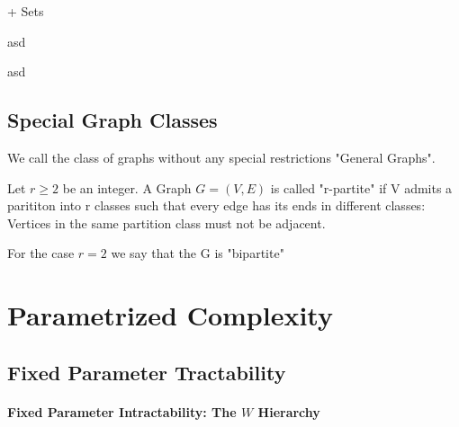 \begin{definition}
+ Sets
\end{definition}

\begin{definition}
    asd
\end{definition}

\begin{definition}
    asd
\end{definition}

\subsection*{Special Graph Classes}
We call the class of graphs without any special restrictions "General Graphs".

\begin{definition}
    Let $r \geq 2$ be an integer. A Graph $G = (V,E)$ is called "r-partite" if V admits a parititon into r classes such that every edge has its ends in different classes: Vertices in the same partition class must not be adjacent. 
    
    For the case $r = 2$ we say that the G is "bipartite" 

\end{definition}

\begin{definition}
    
\end{definition}

\begin{definition}
    
\end{definition}


\section{Parametrized Complexity}

\subsection{Fixed Parameter Tractability}
\paragraph{Fixed Parameter Intractability: The \hmath $W$ Hierarchy}
